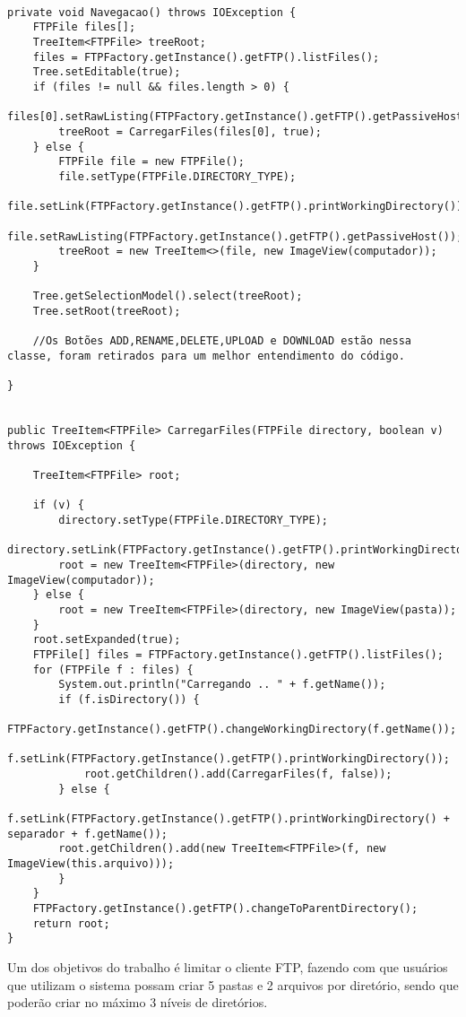 \documentclass[12pt]{article}
\begin{document}
\begin{lstlisting}

private void Navegacao() throws IOException {
	FTPFile files[];
	TreeItem<FTPFile> treeRoot;
	files = FTPFactory.getInstance().getFTP().listFiles();
	Tree.setEditable(true);
	if (files != null && files.length > 0) {
		files[0].setRawListing(FTPFactory.getInstance().getFTP().getPassiveHost());
		treeRoot = CarregarFiles(files[0], true);
	} else {
		FTPFile file = new FTPFile();
		file.setType(FTPFile.DIRECTORY_TYPE);
		file.setLink(FTPFactory.getInstance().getFTP().printWorkingDirectory());
		file.setRawListing(FTPFactory.getInstance().getFTP().getPassiveHost());
		treeRoot = new TreeItem<>(file, new ImageView(computador));
	}
	
	Tree.getSelectionModel().select(treeRoot);	
	Tree.setRoot(treeRoot);
	
	//Os Botões ADD,RENAME,DELETE,UPLOAD e DOWNLOAD estão nessa classe, foram retirados para um melhor entendimento do código.

}


public TreeItem<FTPFile> CarregarFiles(FTPFile directory, boolean v) throws IOException {
	
	TreeItem<FTPFile> root;

	if (v) {
		directory.setType(FTPFile.DIRECTORY_TYPE);
		directory.setLink(FTPFactory.getInstance().getFTP().printWorkingDirectory());
		root = new TreeItem<FTPFile>(directory, new ImageView(computador));
    } else {
		root = new TreeItem<FTPFile>(directory, new ImageView(pasta));
	}
	root.setExpanded(true);
	FTPFile[] files = FTPFactory.getInstance().getFTP().listFiles();
	for (FTPFile f : files) {
		System.out.println("Carregando .. " + f.getName());
	    if (f.isDirectory()) {
			FTPFactory.getInstance().getFTP().changeWorkingDirectory(f.getName());
			f.setLink(FTPFactory.getInstance().getFTP().printWorkingDirectory());
			root.getChildren().add(CarregarFiles(f, false));
		} else {
		f.setLink(FTPFactory.getInstance().getFTP().printWorkingDirectory() + separador + f.getName());
		root.getChildren().add(new TreeItem<FTPFile>(f, new ImageView(this.arquivo)));
		}
	}
	FTPFactory.getInstance().getFTP().changeToParentDirectory(); 
	return root;
}

\end{lstlisting}

Um dos objetivos do trabalho é limitar o cliente FTP, fazendo com que usuários que utilizam o sistema possam criar 5 pastas e 2 arquivos por diretório, sendo que poderão criar no máximo 3 níveis de diretórios.
\end{document}
